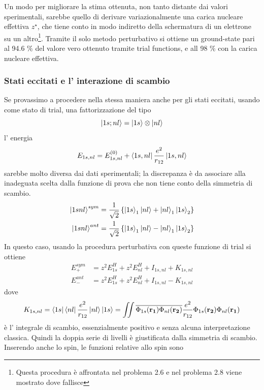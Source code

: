 \documentclass[11pt,a4paper]{article}
\theoremstyle{springer}
\theoremstyle{definition}
\theoremstyle{remark}
\begin{document}
\begin{deepbox}{}
  Un modo per migliorare la stima ottenuta, non tanto distante dai valori sperimentali, sarebbe quello di derivare variazionalmente una carica nucleare effettiva $z^\star$, che tiene conto in modo indiretto della schermatura di un elettrone su un altro\footnote{Questa procedura è affrontata nel problema 2.6 e nel problema 2.8 viene mostrato dove fallisce}. Tramite il solo metodo perturbativo si ottiene un ground-state pari al 94.6 \% del valore vero ottenuto tramite trial functions, e all 98 \% con la carica nucleare effettiva.
\end{deepbox}


\subsubsection{Stati eccitati e l' interazione di scambio}
Se provassimo a procedere nella stessa maniera anche per gli stati eccitati, usando come stato di trial, una fattorizzazione del tipo
\begin{equation*}
  \ket{1s;nl} = \ket{1s}\otimes\ket{nl}
\end{equation*}
l' energia
\begin{equation*}
  E_{1s,nl} = E_{1s,nl}^{(0)}+ \bra{1s,nl} \frac{e^2}{r_{12}} \ket{1s,nl}
\end{equation*}
sarebbe molto diversa dai dati sperimentali; la discrepanza è da associare alla inadeguata scelta dalla funzione di prova che non tiene conto della simmetria di scambio.
\begin{align*}
  \ket{1snl}^{sym} &= \frac{1}{\sqrt{2}}\left\{\ket{1s}_1\ket{nl}+\ket{nl}_1\ket{1s}_2\right\}\\
  \ket{1snl}^{ant} &= \frac{1}{\sqrt{2}}\left\{\ket{1s}_1\ket{nl}-\ket{nl}_1\ket{1s}_2\right\}
\end{align*}
In questo caso, usando la procedura perturbativa con queste funzione di trial si ottiene
\begin{align*}
  E_{+}^{sym} &= z^2E_{1s}^H+z^2E_{nl}^H + I_{1s,nl}+ K_{1s,nl}\\
  E_{-}^{ant} &= z^2E_{1s}^H+z^2E_{nl}^H + I_{1s,nl}- K_{1s,nl}
\end{align*}
dove 
\begin{equation*}
  K_{1s,nl} = \bra{1s}\bra{nl}\frac{e^2}{r_{12}}\ket{nl}\ket{1s} = \iint \overline{\Phi_{1s}(\mathbf{r_1})\Phi_{nl}(\mathbf{r_2})} \frac{e^2}{r_{12}}\Phi_{1s}(\mathbf{r_2})\Phi_{nl}(\mathbf{r_1})
\end{equation*}
è l' integrale di scambio, essenzialmente positivo e senza alcuna interpretazione classica. Quindi la doppia serie di livelli è giustificata dalla simmetria di scambio. Inserendo anche lo spin, le funzioni relative allo spin sono 
\end{document}
